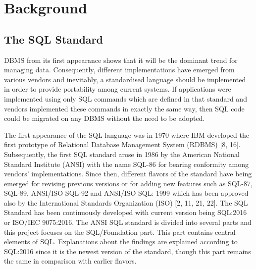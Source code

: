 \chapter{Background}

\section{The SQL Standard }
DBMS from its first appearance shows that it will be the dominant trend for managing data. Consequently, different implementations have emerged from various vendors and inevitably, a standardised language should be implemented in order to provide portability among current systems. If applications were implemented using only SQL commands which are defined in that standard and vendors implemented these commands in exactly the same way, then SQL code could be migrated on any DBMS without the need to be adopted.

The first appearance of the SQL language was in 1970 where IBM developed the first prototype of Relational Database Management System (RDBMS) [8, 16]. Subsequently, the first SQL standard arose in 1986 by the American National Standard Institute (ANSI) with the name SQL-86 for bearing conformity among vendors’ implementations. Since then, different flavors of the standard have being emerged for revising previous versions or for adding new features such as SQL-87, SQL-89, ANSI/ISO SQL-92 and ANSI/ISO SQL: 1999 which has been approved also by the International Standards Organization (ISO) [2, 11, 21, 22]. The SQL Standard has been continuously developed with current version being SQL:2016 or ISO/IEC 9075:2016. The ANSI SQL standard is divided into several parts and this project focuses on the SQL/Foundation part. This part contains central elements of SQL. Explanations about the findings are explained according to SQL:2016 since it is the newest version of the standard, though this part  remains the same in comparison with earlier flavors. 

